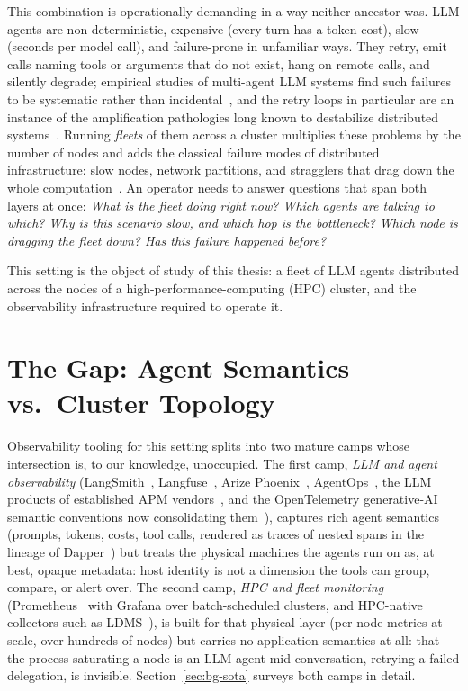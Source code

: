 This combination is operationally demanding in a way neither ancestor was.
LLM agents are non-deterministic, expensive (every turn has a token cost),
slow (seconds per model call), and failure-prone in unfamiliar ways.
They retry, emit calls naming tools or arguments that do not exist, hang on
remote calls, and
silently degrade; empirical studies of multi-agent LLM systems find such
failures to be systematic rather than incidental~\cite{cemri2025mast}, and
the retry loops in particular are an instance of the amplification
pathologies long known to destabilize distributed
systems~\cite{bronson2021metastable}.
Running \emph{fleets} of them across a cluster multiplies these problems by
the number of nodes and adds the classical failure modes of distributed
infrastructure: slow nodes, network partitions, and stragglers that drag
down the whole computation~\cite{gunawi2018failslow}. An operator
needs to answer questions that span both layers at once: \emph{What is
the fleet doing right now? Which agents are talking to which? Why is this
scenario slow, and which hop is the bottleneck? Which node is dragging the
fleet down? Has this failure happened before?}

This setting is the object of study of this thesis: a fleet of LLM
agents distributed across the nodes of a high-performance-computing (HPC)
cluster, and the observability infrastructure required to operate it.

\section{The Gap: Agent Semantics vs.\ Cluster Topology}
\label{sec:intro-gap}

Observability tooling for this setting splits into two mature camps whose
intersection is, to our knowledge, unoccupied. The first camp,
\emph{LLM and agent observability} (LangSmith~\cite{langsmith},
Langfuse~\cite{langfuse}, Arize Phoenix~\cite{phoenix},
AgentOps~\cite{agentops}, the LLM products of established APM
vendors~\cite{datadogllm}, and the OpenTelemetry generative-AI semantic
conventions now consolidating them~\cite{otelgenai}), captures rich agent
semantics (prompts, tokens, costs, tool calls, rendered as traces of nested
spans in the lineage of Dapper~\cite{sigelman2010dapper}) but treats
the physical machines the agents run on as, at best, opaque metadata: host
identity is not a dimension the tools can group, compare, or alert over.
The second camp, \emph{HPC and fleet monitoring}
(Prometheus~\cite{prometheus} with Grafana over batch-scheduled clusters, and
HPC-native collectors such as LDMS~\cite{agelastos2014ldms}), is built for
that physical layer (per-node metrics at scale, over hundreds of
nodes) but carries no application semantics at all: that the process
saturating a node is an LLM agent mid-conversation, retrying a failed
delegation, is invisible. Section~\ref{sec:bg-sota} surveys both camps in
detail.

